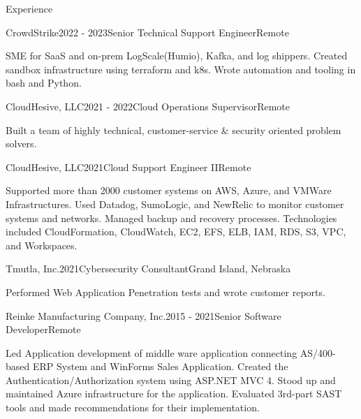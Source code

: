 \documentclass{resume} %
\begin{document}

\begin{rSection}{Experience}

\begin{rSubsection}{CrowdStrike}{2022 - 2023}{Senior Technical Support Engineer}{Remote}
	\item SME for SaaS and on-prem LogScale(Humio), Kafka, and log shippers. Created sandbox infrastructure using terraform and k8s. Wrote automation and tooling in bash and Python.
\end{rSubsection}

\begin{rSubsection}{CloudHesive, LLC}{2021 - 2022}{Cloud Operations Supervisor}{Remote}
\item Built a team of highly technical, customer-service \& security oriented problem solvers.  
\end{rSubsection}

\begin{rSubsection}{CloudHesive, LLC}{2021}{Cloud Support Engineer II}{Remote}
\item Supported more than 2000 customer systems on AWS, Azure, and VMWare Infrastructures. Used Datadog, SumoLogic, and NewRelic to monitor customer systems and networks. Managed backup and recovery processes. Technologies included CloudFormation, CloudWatch, EC2, EFS, ELB, IAM, RDS, S3, VPC, and Workspaces.  
\end{rSubsection}

\begin{rSubsection}{Tmutla, Inc.}{2021}{Cybersecurity Consultant}{Grand Island, Nebraska}
\item Performed Web Application Penetration tests and wrote customer reports.
\end{rSubsection}

\begin{rSubsection}{Reinke Manufacturing Company, Inc.}{2015 - 2021}{Senior Software Developer}{Remote} 
\item Led Application development of middle ware application connecting AS/400-based ERP System and WinForms Sales Application. Created the Authentication/Authorization system using ASP.NET MVC 4. Stood up and maintained Azure infrastructure for the application. Evaluated 3rd-part SAST tools and made recommendations for their implementation.
\end{rSubsection}


\end{rSection}
\end{document}
